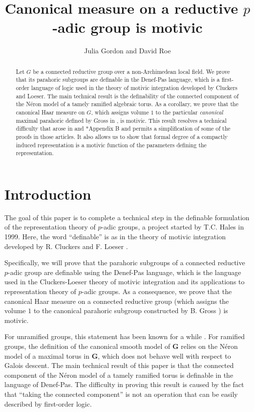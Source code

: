 \documentclass{amsart}
\title[]{Canonical measure on a reductive $p$-adic group is motivic}
\author{Julia Gordon and David Roe}
\newcommand{\bG}{\mathbf{G}}
\theoremstyle{plain}
\theoremstyle{definition}
\begin{document}
\begin{abstract}  Let $G$ be a connected reductive group over a non-Archimedean local field. 
We prove that its parahoric subgroups are definable in the Denef-Pas language, which is a
first-order language of logic used in the theory of motivic integration developed by Cluckers and Loeser.
The main technical result is the definability of the connected component of the N\'eron model
of a tamely ramified algebraic torus.  As a corollary, we prove that the canonical Haar measure on $G$,
which assigns volume $1$ to the particular \emph{canonical} maximal parahoric defined by
Gross in \cite{gross:97a}, is motivic. This result resolves a technical difficulty that arose in
\cite{cluckers-gordon-halupczok:14b} and \cite{shin-templier:15a}*{Appendix B} and permits a simplification of some of the proofs in those articles. 
It also allows us to show that formal degree of a compactly induced representation is a
motivic function of the parameters defining the representation. 
\end{abstract}
\maketitle

\section{Introduction}
The goal of this paper is to complete a technical step in the 
definable formulation of 
the representation theory of $p$-adic groups, a project started by T.C. Hales in 1999. 
Here, the word ``definable'' is as in the theory of motivic integration developed by R. Cluckers and F. Loeser \cite{cluckers-loeser:08a}.

Specifically, we will prove that the parahoric subgroups of a connected reductive $p$-adic group
are definable using the Denef-Pas language, which is the language used in the Cluckers-Loeser
theory of motivic integration and its applications to representation theory of $p$-adic groups.
As a consequence, we prove that the canonical Haar measure on a connected reductive group 
(which assigns the volume $1$ to the canonical parahoric subgroup constructed by B. Gross \cite{gross:97a}) is motivic.

For unramified groups, this statement has been known for a while \cite{cluckers-hales-loeser}.
For ramified groups, the definition of the canonical smooth model of $\bG$ relies on the
N\'eron model of a maximal torus in $\bG$, which does not behave well with respect to Galois descent.
The main technical result of this paper is that the connected component of the N\'eron model
of a tamely ramified torus is definable in the language of Denef-Pas. The difficulty in proving this result
is caused by the fact that ``taking the connected component'' is not an operation that can be easily
described by first-order logic. 
\end{document}
